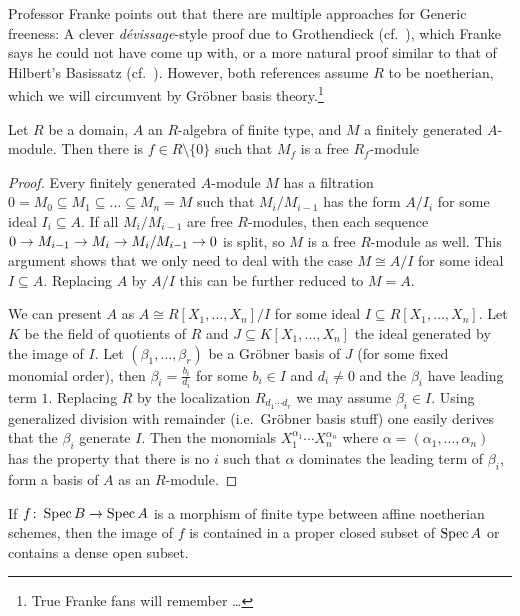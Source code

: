 \documentclass[a4paper,parskip=half,numbers=enddot, DIV=12]{scrreprt}
\begin{document}
Professor Franke points out that there are multiple approaches for Generic freeness: A clever \emph{dévissage}-style proof due to Grothendieck (cf.\ \cite[Theorem~14.4]{eisenbudCommAlg}), which Franke says he could not have come up with, or a more natural proof similar to that of Hilbert's Basissatz (cf.\ \cite[\S 24]{matsumuraCRT}). However, both references assume $R$ to be noetherian, which we will circumvent by Gröbner basis theory.\footnote{True Franke fans will remember \ldots}
\begin{prop}
	Let $R$ be a domain, $A$ an $R$-algebra of finite type, and $M$ a finitely generated $A$-module. Then there is $f\in R\setminus\{0\}$ such that $M_f$ is a free $R_f$-module
\end{prop}
\begin{proof}
	Every finitely generated $A$-module $M$ has a filtration $0=M_0\subseteq M_1\subseteq \ldots\subseteq M_n=M$ such that $M_i/M_{i-1}$ has the form $A/I_i$ for some ideal $I_i\subseteq A$. If all $M_i/M_{i-1}$ are free $R$-modules, then each sequence $0\morphism M_{i-1}\morphism M_i\morphism M_i/M_{i-1}\morphism 0$ is split, so $M$ is a free $R$-module as well. This argument shows that we only need to deal with the case $M\cong A/I$ for some ideal $I\subseteq A$. Replacing $A$ by $A/I$ this can be further reduced to $M=A$.
	
	We can present $A$ as $A\cong R[X_1,\ldots,X_n]/I$ for some ideal $I\subseteq R[X_1,\ldots,X_n]$. Let $K$ be the field of quotients of $R$ and $J\subseteq K[X_1,\ldots,X_n]$ the ideal generated by the image of $I$. Let $(\beta_1,\ldots,\beta_r)$ be a Gröbner basis of $J$ (for some fixed monomial order), then $\beta_i=\frac{b_i}{d_i}$ for some $b_i\in I$ and $d_i\neq 0$ and the $\beta_i$ have leading term $1$. Replacing $R$ by the localization $R_{d_1\cdots d_r}$ we may assume $\beta_i\in I$. Using generalized division with remainder (i.e.\ Gröbner basis stuff) one easily derives that the $\beta_i$ generate $I$. Then the monomials $X_1^{\alpha_1}\cdots X_n^{\alpha_n}$ where $\alpha=(\alpha_1,\ldots,\alpha_n)$ has the property that there is no $i$ such that $\alpha$ dominates the leading term of $\beta_i$, form a basis of $A$ as an $R$-module.
\end{proof}
\begin{prop}
	If $f\colon \Spec B\morphism\Spec A$ is a morphism of finite type between affine noetherian schemes, then the image of $f$ is contained in a proper closed subset of $\operatorname{Spec} A$ or contains a dense open subset.
\end{prop}
\end{document}
